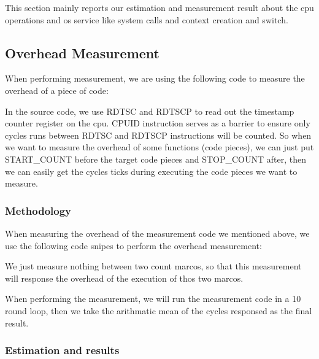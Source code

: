 
This section mainly reports our estimation and measurement result about the cpu operations and os service like system calls and context creation and switch.


\subsection{Overhead Measurement}
When performing measurement, we are using the following code to measure the overhead of a piece of code:



In the source code, we use RDTSC and RDTSCP to read out the timestamp counter register on the cpu. CPUID instruction serves as a barrier to ensure only cycles
runs between RDTSC and RDTSCP instructions will be counted. So when we want to measure the overhead of some functions (code pieces), we can just put START\_COUNT
before the target code pieces and STOP\_COUNT after, then we can easily get the cycles ticks during executing the code pieces we want to measure.


\subsubsection{Methodology}
When measuring the overhead of the measurement code we mentioned above, we use the following code snipes to perform the overhead measurement:



We just measure nothing between two count marcos, so that this measurement will response the overhead of the execution of thos two marcos.

When performing the measurement, we will run the measurement code in a 10 round loop, then we take the arithmatic mean of the cycles responsed as the final result.


\subsubsection{Estimation and results}
\label{overhead_estimation}

